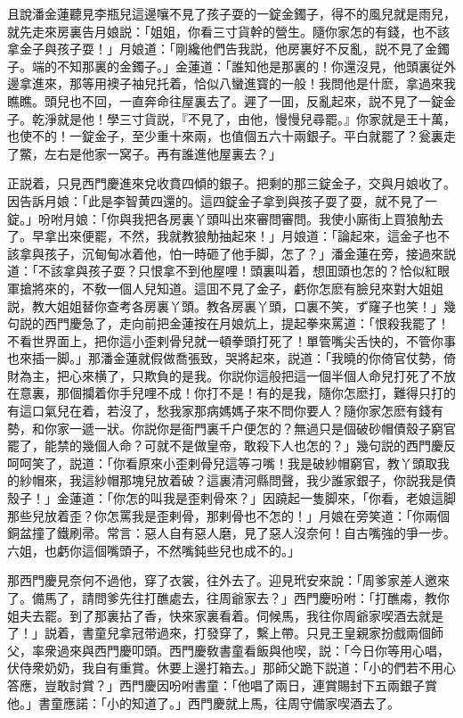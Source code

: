 且說潘金蓮聽見李瓶兒這邊嚷不見了孩子耍的一錠金鐲子，得不的風兒就是雨兒，就先走來房裏告月娘説：「姐姐，你看三寸貨幹的營生。隨你家怎的有錢，也不該拿金子與孩子耍！」月娘道：「剛纔他們告我説，他房裏好不反亂，説不見了金鐲子。端的不知那裏的金鐲子。」金蓮道：「誰知他是那裏的！你還沒見，他頭裏従外邊拿進來，那等用襖子袖兒托着，恰似八蠻進寳的一般！我問他是什麽，拿過來我瞧瞧。頭兒也不回，一直奔命往屋裏去了。遲了一囬，反亂起來，説不見了一錠金子。乾淨就是他！學三寸貨説，『不見了，由他，慢慢兒尋罷。』你家就是王十萬，也使不的！一錠金子，至少重十來兩，也值個五六十兩銀子。平白就罷了？瓮裏走了鱉，左右是他家一窝子。再有誰進他屋裏去？」

正説着，只見西門慶進來兌收賁四傾的銀子。把剩的那三錠金子，交與月娘收了。因告訴月娘：「此是李智黄四還的。這四錠金子拿到與孩子耍了耍，就不見了一錠。」吩咐月娘：「你與我把各房裏丫頭叫出來審問審問。我使小廝街上買狼觔去了。早拿出來便罷，不然，我就教狼觔抽起來！」月娘道：「論起來，這金子也不該拿與孩子，沉甸甸冰着他，怕一時砸了他手脚，怎了？」潘金蓮在旁，接過來説道：「不該拿與孩子耍？只恨拿不到他屋哩！頭裏叫着，想囬頭也怎的？恰似紅眼軍搶將來的，不敎一個人兒知道。這囬不見了金子，虧你怎麽有臉兒來對大姐姐説，教大姐姐替你查考各房裏丫頭。教各房裏丫頭，口裏不笑，ず窿子也笑！」幾句説的西門慶急了，走向前把金蓮按在月娘炕上，提起拳來罵道：「恨殺我罷了！不看世界面上，把你這小歪剌骨兒就一頓拳頭打死了！單管嘴尖舌快的，不管你事也來插一脚。」那潘金蓮就假做喬張致，哭將起來，説道：「我曉的你倚官仗勢，倚財為主，把心來横了，只欺負的是我。你説你這般把這一個半個人命兒打死了不放在意裏，那個攔着你手兒哩不成！你打不是！有的是我，隨你怎麽打，難得只打的有這口氣兒在着，若沒了，愁我家那病媽媽子來不問你要人？隨你家怎麽有錢有勢，和你家一遞一狀。你説你是衙門裏千户便怎的？無過只是個破砂帽債殼子窮官罷了，能禁的幾個人命？可就不是做皇帝，敢殺下人也怎的？」幾句説的西門慶反呵呵笑了，説道：「你看原來小歪剌骨兒這等刁嘴！我是破紗帽窮官，教丫頭取我的紗帽來，我這紗帽那塊兒放着破？這裏清河縣問聲，我少誰家銀子，你説我是債殼子！」金蓮道：「你怎的叫我是歪剌骨來？」因蹺起一隻脚來，「你看，老娘這脚那些兒放着歪？你怎罵我是歪剌骨，那剌骨也不怎的！」月娘在旁笑道：「你兩個銅盆撞了鐵刷帚。常言：惡人自有惡人磨，見了惡人沒奈何！自古嘴強的爭一步。六姐，也虧你這個嘴頭子，不然嘴鈍些兒也成不的。」

那西門慶見奈何不過他，穿了衣裳，往外去了。迎見玳安來說：「周爹家差人邀來了。備馬了，請問爹先往打醮處去，往周爺家去？」西門慶吩咐：「打醮䖏，教你姐夫去罷。到了那裏拈了香，快來家裏看着。伺候馬，我往你周爺家喫酒去就是了！」説着，書童兒拿冠带過來，打發穿了，繫上帶。只見王皇親家扮戲兩個師父，率衆過來與西門慶叩頭。西門慶敎書童看飯與他喫，説：「今日你等用心唱，伏侍衆奶奶，我自有重賞。休要上邊打箱去。」那師父跪下説道：「小的們若不用心答應，豈敢討賞？」西門慶因吩咐書童：「他唱了兩日，連賞賜封下五兩銀子賞他。」書童應諾：「小的知道了。」西門慶就上馬，往周守備家喫酒去了。

